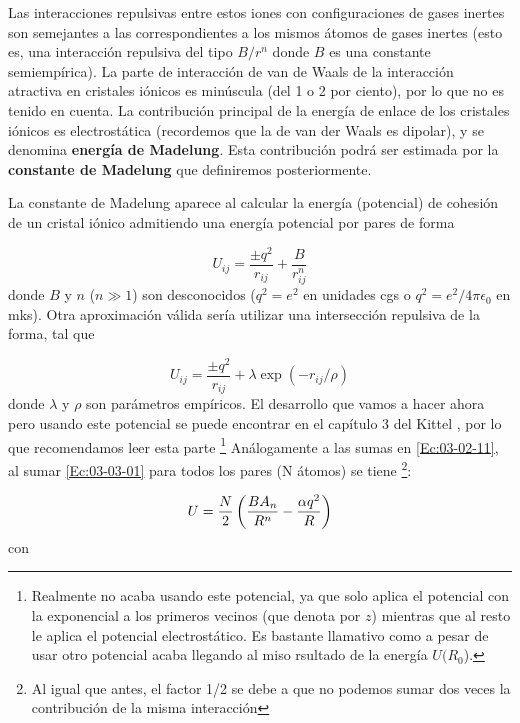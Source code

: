 Las interacciones repulsivas entre estos iones con configuraciones de gases inertes son semejantes a las correspondientes a los mismos átomos de gases inertes (esto es, una interacción repulsiva del tipo $B/r^n$ donde $B$ es una constante semiempírica). La parte de interacción de van de Waals de la interacción atractiva en cristales iónicos es minúscula (del 1 o 2 por ciento), por lo que no es tenido en cuenta. La contribución principal de la energía de enlace de los cristales iónicos es electrostática (recordemos que la de van der Waals es dipolar), y se denomina \textbf{energía de Madelung}. Esta contribución podrá ser estimada por la \textbf{constante de Madelung} que definiremos posteriormente. 

La constante de Madelung aparece al calcular la energía (potencial) de cohesión de un cristal iónico admitiendo una energía potencial por pares de forma 

\begin{equation}
    U_{ij} = \frac{\pm q^2}{r_{ij}} + \frac{B}{r_{ij}^n} \label{Ec:03-03-01}
\end{equation} 
donde $B$ y $n$ ($n\gg 1$) son desconocidos ($q^2 = e^2$ en unidades cgs o $q^2=e^2 / 4 \pi \epsilon_0$ en mks). Otra aproximación válida sería utilizar una intersección repulsiva de la forma, tal que 

\begin{equation*}
	U_{ij} = \frac{\pm q^2}{r_{ij}} + \lambda \exp(-r_{ij}/\rho) 
\end{equation*} 
donde $\lambda$ y $\rho$ son parámetros empíricos. El desarrollo que vamos a hacer ahora pero usando este potencial se puede encontrar en el capítulo 3 del Kittel \cite{Estado_Solido_Kittel}, por lo que recomendamos leer esta parte \footnote{Realmente no acaba usando este potencial, ya que solo aplica el potencial con la exponencial a los primeros vecinos (que denota por $z$) mientras que al resto le aplica el potencial electrostático. Es bastante llamativo como a pesar de usar otro potencial acaba llegando al miso rsultado de la energía $U(R_0$).} Análogamente a las sumas en \ref{Ec:03-02-11}, al sumar \ref{Ec:03-03-01} para todos los pares (N átomos) se tiene \footnote{Al igual que antes, el factor 1/2 se debe a que no podemos sumar dos veces la contribución de la misma interacción}:

\begin{equation}
    U = \frac{N}{2} \left( \frac{BA_n}{R^n}-\frac{\alpha q^2}{R} \right)
\end{equation}
con 


